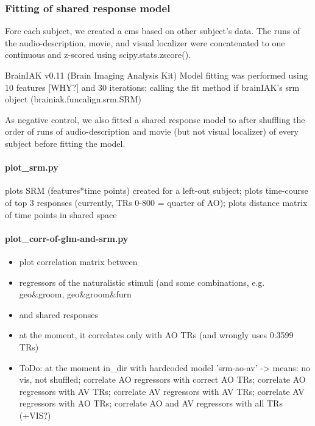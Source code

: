 \subsubsection{Fitting of shared response model}





Fore each subject, we created a \ac{cms} based on other subject's data.
%
The runs of the audio-description, movie, and visual localizer were concatenated
to one continuous and z-scored using scipy.stats.zscore().


BrainIAK v0.11 (Brain Imaging Analysis Kit) \citep{kumar2020brainiak, kumar2020brainiaktutorial}
Model fitting was performed using 10 features [WHY?] and 30 iterations; calling
the fit method if brainIAK's srm object (brainiak.funcalign.srm.SRM)

As negative control, we also fitted a shared response model to after shuffling
the order of runs of audio-description and movie (but not visual localizer) of
every subject before fitting the model.


\paragraph{plot\_srm.py}

%
plots SRM (features*time points) created for a left-out subject; plots
time-course of top 3 responses (currently, TRs 0-800 = quarter of AO); plots
distance matrix of time points in shared space


\paragraph{plot\_corr-of-glm-and-srm.py}
%
\begin{itemize}
    \item plot correlation matrix between
    \item regressors of the naturalistic stimuli (and some combinations, e.g.
        geo\&groom, geo\&groom\&furn
    \item and shared responses
    \item at the moment, it correlates only with AO TRs (and wrongly uses
        0:3599 TRs)
    \item ToDo: at the moment in\_dir with hardcoded model 'srm-ao-av'
    ->  means: no vis, not shuffled; correlate AO regressors with correct AO
        TRs; correlate AO regressors with AV TRs; correlate AV regressors with
        AV TRs; correlate AV regressors with AO TRs; correlate AO and AV
        regressors with all TRs (+VIS?)
\end{itemize}


